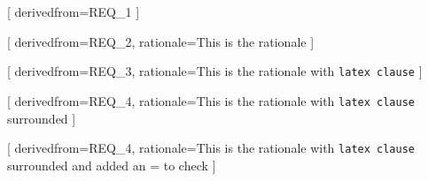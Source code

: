 


[
  derivedfrom=REQ\_1
]

[
  derivedfrom=REQ\_2,
  rationale=This is the rationale
]

[
  derivedfrom=REQ\_3,
  rationale=This is the rationale with \texttt{latex clause}
]

[
  derivedfrom=REQ\_4,
  rationale={This is the rationale with \texttt{latex clause} surrounded}
]

[
  derivedfrom=REQ\_4,
  rationale={This is the rationale with \texttt{latex clause} surrounded and added an = to check}
]
